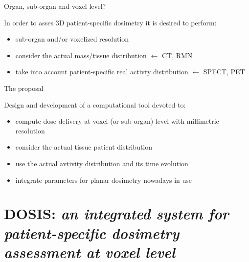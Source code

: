 \documentclass[ignorenonframetext,]{beamer}
\begin{document}
\begin{frame}{Organ, sub-organ and voxel level?}
\protect\hypertarget{organ-sub-organ-and-voxel-level}{}

In order to asses 3D patient-specific dosimetry it is desired to
perform:

\begin{itemize}
\item
  sub-organ and/or voxelized resolution
\item
  consider the actual mass/tissue distribution \(\leftarrow\) CT, RMN
\item
  take into account patient-specific real activty distribution
  \(\leftarrow\) SPECT, PET
\end{itemize}

\end{frame}

\begin{frame}{The proposal}
\protect\hypertarget{the-proposal}{}

Design and development of a computational tool devoted to:

\begin{itemize}
\item
  compute dose delivery at voxel (or sub-organ) level with millimetric
  resolution
\item
  consider the actual tissue patient distribution
\item
  use the actual avtivity distribution and its time evolution
\item
  integrate parameters for planar dosimetry nowadays in use
\end{itemize}

\end{frame}

\hypertarget{dosis-an-integrated-system-for-patient-specific-dosimetry-assessment-at-voxel-level}{%
\section{\texorpdfstring{DOSIS: \emph{an integrated system for
patient-specific dosimetry assessment at voxel
level}}{DOSIS: an integrated system for patient-specific dosimetry assessment at voxel level}}\label{dosis-an-integrated-system-for-patient-specific-dosimetry-assessment-at-voxel-level}}
\end{document}
